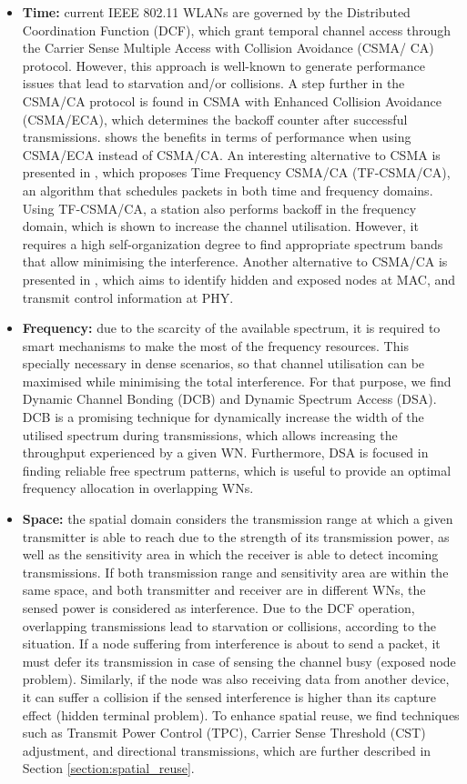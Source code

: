 \documentclass[12pt, a4paper,twoside]{tesi_upf}
\begin{document}
			
			\begin{itemize}
				\item \textbf{Time:} current IEEE 802.11 WLANs are governed by the Distributed Coordination Function (DCF), which grant temporal channel access through the Carrier Sense Multiple Access with Collision Avoidance (CSMA/ CA) protocol. However, this approach is well-known to generate performance issues that lead to starvation and/or collisions. A step further in the CSMA/CA protocol is found in CSMA with Enhanced Collision Avoidance (CSMA/ECA), which determines the backoff counter after successful transmissions. \cite{barcelo2009csma} shows the benefits in terms of performance when using CSMA/ECA instead of CSMA/CA. An interesting alternative to CSMA is presented in \cite{herzen2015csma}, which proposes Time Frequency CSMA/CA (TF-CSMA/CA), an algorithm that schedules packets in both time and frequency domains. Using TF-CSMA/CA, a station also performs backoff in the frequency domain, which is shown to increase the channel utilisation. However, it requires a high self-organization degree to find appropriate spectrum bands that allow minimising the interference. Another alternative to CSMA/CA is presented in \cite{wang2012combating}, which aims to identify hidden and exposed nodes at MAC, and transmit control information at PHY.
				\item \textbf{Frequency:} due to the scarcity of the available spectrum, it is required to smart mechanisms to make the most of the frequency resources. This specially necessary in dense scenarios, so that channel utilisation can be maximised while minimising the total interference. For that purpose, we find Dynamic Channel Bonding (DCB) and Dynamic Spectrum Access (DSA). DCB is a promising technique for dynamically increase the width of the utilised spectrum during transmissions, which allows increasing the throughput experienced by a given WN. Furthermore, DSA is focused in finding reliable free spectrum patterns, which is useful to provide an optimal frequency allocation in overlapping WNs.
				\item \textbf{Space:} the spatial domain considers the transmission range at which a given transmitter is able to reach due to the strength of its transmission power, as well as the sensitivity area in which the receiver is able to detect incoming transmissions. If both transmission range and sensitivity area are within the same space, and both transmitter and receiver are in different WNs, the sensed power is considered as interference. Due to the DCF operation, overlapping transmissions lead to starvation or collisions, according to the situation. If a node suffering from interference is about to send a packet, it must defer its transmission in case of sensing the channel busy (exposed node problem). Similarly, if the node was also receiving data from another device, it can suffer a collision if the sensed interference is higher than its capture effect (hidden terminal problem). To enhance spatial reuse, we find techniques such as Transmit Power Control (TPC), Carrier Sense Threshold (CST) adjustment, and directional transmissions, which are further described in Section \ref{section:spatial_reuse}.
			\end{itemize}		
				
\end{document}
